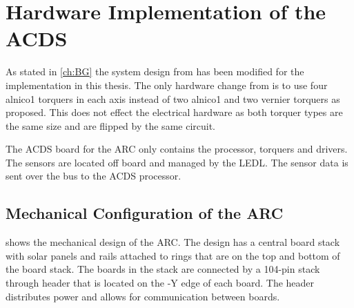 
\chapter{Hardware Implementation of the \acf*{ACDS}}\label{ch:CubeSatHardware}

As stated in \cref{ch:BG} the system design from \cite{Mentch11} has been modified for the implementation in this thesis. The only hardware change from \cite{Mentch11} is to use four alnico1 torquers in each axis instead of two alnico1 and two vernier torquers as proposed. This does not effect the electrical hardware as both torquer types are the same size and are flipped by the same circuit.

The \ac{ACDS} board for the \ac{ARC} only contains the processor, torquers and drivers. The sensors are located off board and managed by the \ac{LEDL}. The sensor data is sent over the bus to the \ac{ACDS} processor. 


\section{Mechanical Configuration of the \acf*{ARC}}

 shows the mechanical design of the \ac{ARC}. The design has a central board stack with solar panels and rails attached to rings that are on the top and bottom of the board stack. The boards in the stack are connected by a 104-pin stack through header that is located on the -Y edge of each board. The header distributes power and allows for communication between boards. 

